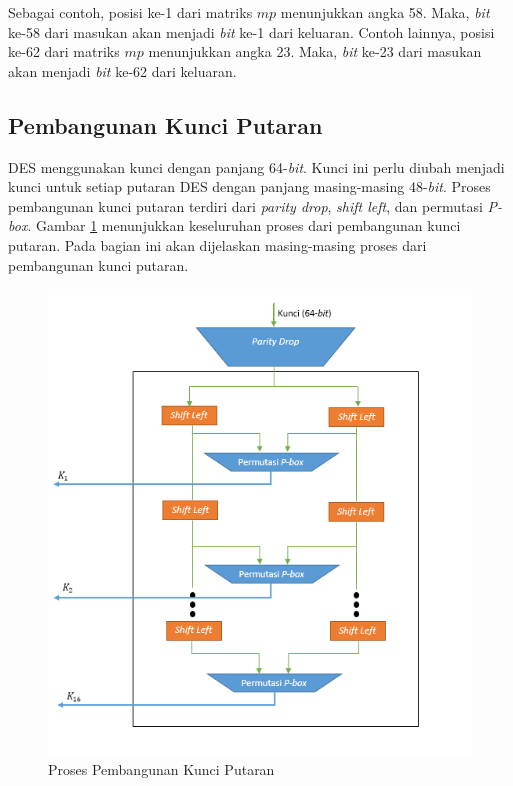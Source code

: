 Sebagai contoh, posisi ke-1 dari matriks \begin{math}mp\end{math} menunjukkan angka 58. Maka, \textit{bit} ke-58 dari masukan akan menjadi \textit{bit} ke-1 dari keluaran. Contoh lainnya, posisi ke-62 dari matriks $mp$ menunjukkan angka 23. Maka, \textit{bit} ke-23 dari masukan akan menjadi \textit{bit} ke-62 dari keluaran.

\subsection{Pembangunan Kunci Putaran}

DES menggunakan kunci dengan panjang 64-\textit{bit}. Kunci ini perlu diubah menjadi kunci untuk setiap putaran DES dengan panjang masing-masing 48-\textit{bit}. Proses pembangunan kunci putaran terdiri dari \textit{parity drop}, \textit{shift left}, dan permutasi \textit{P-box}. Gambar \ref{fig:keygenerate} menunjukkan keseluruhan proses dari pembangunan kunci putaran. Pada bagian ini akan dijelaskan masing-masing proses dari pembangunan kunci putaran.

\begin{figure}[H]
	\includegraphics[scale=0.7]{Gambar/key_generate}
	\centering
	\caption{Proses Pembangunan Kunci Putaran}\label{fig:keygenerate}
\end{figure}

